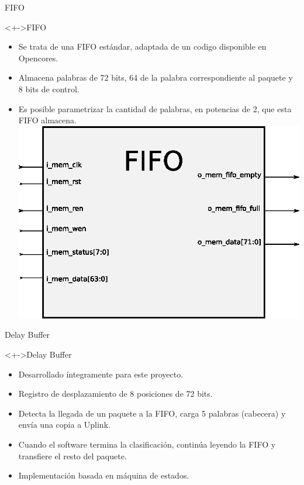 \documentclass[xcolor=dvipsnames]{beamer}
\begin{document}
\begin{frame}{FIFO}
  \begin{block}<+->{FIFO}
	\begin{itemize}
      \scriptsize
	\item Se trata de una FIFO estándar, adaptada de un codigo disponible en Opencores.
	\item Almacena palabras de 72 bits, 64 de la palabra correspondiente al paquete y 8  bits de control.
	\item Es posible parametrizar la cantidad de palabras, en potencias de 2, que esta FIFO almacena.
	\center
	\includegraphics[scale=0.40]{figures/bloqfifo.eps}
	   \end{itemize}
\end{block}

\end{frame}


\begin{frame}{Delay Buffer}
 \begin{block}<+->{Delay Buffer}
	\begin{itemize}
      \scriptsize
	\item Desarrollado íntegramente para este proyecto.
	\item Registro de desplazamiento de 8 posiciones de 72 bits.
	\item Detecta la llegada de un paquete a la FIFO, carga 5 palabras (cabecera) y envía una copia a Uplink.
	\item Cuando el software termina la clasificación, continúa leyendo la FIFO y transfiere el resto del paquete.
	\item Implementación basada en máquina de estados.

	   \end{itemize}
\end{block}

\end{frame}
\end{document}
